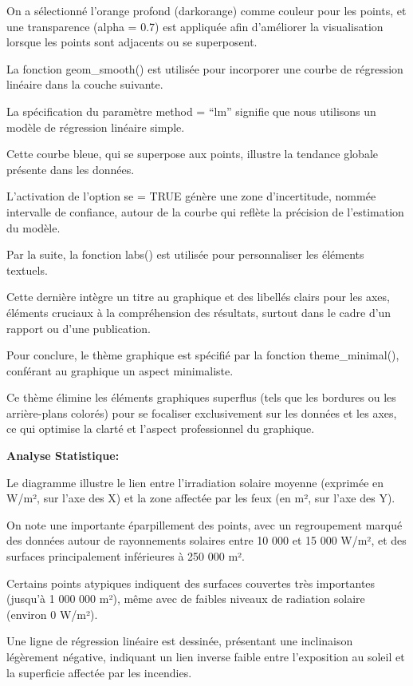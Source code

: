 \documentclass[
]{article}
\begin{document}
On a sélectionné l'orange profond (darkorange) comme couleur pour les
points, et une transparence (alpha = 0.7) est appliquée afin d'améliorer
la visualisation lorsque les points sont adjacents ou se superposent.

La fonction geom\_smooth() est utilisée pour incorporer une courbe de
régression linéaire dans la couche suivante.

La spécification du paramètre method = ``lm'' signifie que nous
utilisons un modèle de régression linéaire simple.

Cette courbe bleue, qui se superpose aux points, illustre la tendance
globale présente dans les données.

L'activation de l'option se = TRUE génère une zone d'incertitude, nommée
intervalle de confiance, autour de la courbe qui reflète la précision de
l'estimation du modèle.

Par la suite, la fonction labs() est utilisée pour personnaliser les
éléments textuels.

Cette dernière intègre un titre au graphique et des libellés clairs pour
les axes, éléments cruciaux à la compréhension des résultats, surtout
dans le cadre d'un rapport ou d'une publication.

Pour conclure, le thème graphique est spécifié par la fonction
theme\_minimal(), conférant au graphique un aspect minimaliste.

Ce thème élimine les éléments graphiques superflus (tels que les
bordures ou les arrière-plans colorés) pour se focaliser exclusivement
sur les données et les axes, ce qui optimise la clarté et l'aspect
professionnel du graphique.

\textbf{Analyse Statistique:}

Le diagramme illustre le lien entre l'irradiation solaire moyenne
(exprimée en W/m², sur l'axe des X) et la zone affectée par les feux (en
m², sur l'axe des Y).

On note une importante éparpillement des points, avec un regroupement
marqué des données autour de rayonnements solaires entre 10 000 et 15
000 W/m², et des surfaces principalement inférieures à 250 000 m².

Certains points atypiques indiquent des surfaces couvertes très
importantes (jusqu'à 1 000 000 m²), même avec de faibles niveaux de
radiation solaire (environ 0 W/m²).

Une ligne de régression linéaire est dessinée, présentant une
inclinaison légèrement négative, indiquant un lien inverse faible entre
l'exposition au soleil et la superficie affectée par les incendies.
\end{document}
